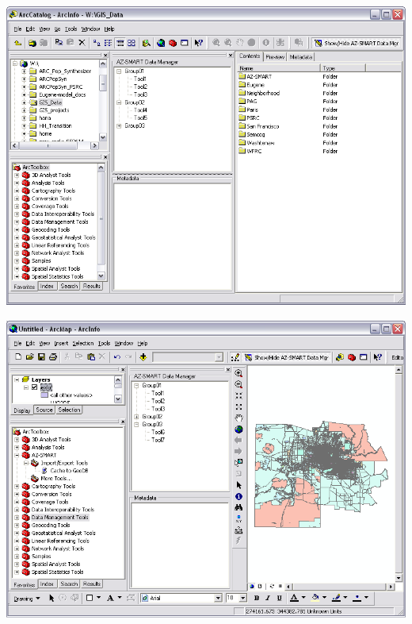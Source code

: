 \begin{center}
\includegraphics[scale=0.5]{figures/AZ-SMART_DataManager_in_ArcCatalog.png}
\end{center}

\begin{center}
\includegraphics[scale=0.5]{figures/AZ-SMART_DataManager_in_ArcMap.png}
\end{center}


